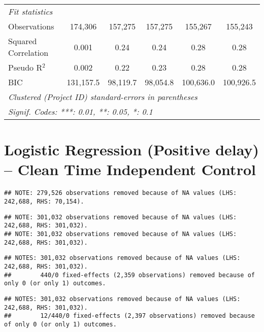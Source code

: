 \documentclass[
]{article}
\begin{document}
\begin{table}[htbp]
\begin{tabular}{lccccc}
      \emph{Fit statistics}\\
      Observations                 & 174,306       & 157,275       & 157,275      & 155,267       & 155,243\\  
      Squared Correlation          & 0.001         & 0.24          & 0.24         & 0.28          & 0.28\\  
      Pseudo R$^2$                 & 0.002         & 0.22          & 0.23         & 0.28          & 0.28\\  
      BIC                          & 131,157.5     & 98,119.7      & 98,054.8     & 100,636.0     & 100,926.5\\  
      \midrule \midrule
      \multicolumn{6}{l}{\emph{Clustered (Project ID) standard-errors in parentheses}}\\
      \multicolumn{6}{l}{\emph{Signif. Codes: ***: 0.01, **: 0.05, *: 0.1}}\\
   \end{tabular}
\end{table}

\hypertarget{logistic-regression-positive-delay-clean-time-independent-control}{%
\section{Logistic Regression (Positive delay) -- Clean Time Independent
Control}\label{logistic-regression-positive-delay-clean-time-independent-control}}

\begin{verbatim}
## NOTE: 279,526 observations removed because of NA values (LHS: 242,688, RHS: 70,154).
\end{verbatim}

\begin{verbatim}
## NOTE: 301,032 observations removed because of NA values (LHS: 242,688, RHS: 301,032).
## NOTE: 301,032 observations removed because of NA values (LHS: 242,688, RHS: 301,032).
\end{verbatim}

\begin{verbatim}
## NOTES: 301,032 observations removed because of NA values (LHS: 242,688, RHS: 301,032).
##        440/0 fixed-effects (2,359 observations) removed because of only 0 (or only 1) outcomes.
\end{verbatim}

\begin{verbatim}
## NOTES: 301,032 observations removed because of NA values (LHS: 242,688, RHS: 301,032).
##        12/440/0 fixed-effects (2,397 observations) removed because of only 0 (or only 1) outcomes.
\end{verbatim}
\end{document}
